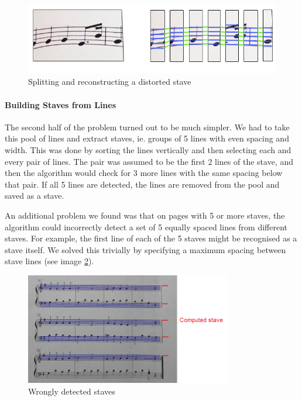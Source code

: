 \begin{figure}[h!]
    \centering
    \includegraphics[width=120mm]{./assets/building_lines.png}
    \caption{Splitting and reconstructing a distorted stave}
    \label{image:linesjoining}
\end{figure}

\paragraph{Building Staves from Lines}

The second half of the problem turned out to be much simpler. We had to take this pool of lines and extract staves, ie. groups of 5 lines with even spacing and width. This was done by sorting the lines vertically and then selecting each and every pair of lines. The pair was assumed to be the first 2 lines of the stave, and then the algorithm would check for 3 more lines with the same spacing below that pair. If all 5 lines are detected, the lines
are removed from the pool and saved as a stave.

An additional problem we found was that on pages with 5 or more staves, the algorithm could incorrectly detect a set of 5 equally spaced lines from different staves. For example, the first line of each of the 5 staves might be recognised as a stave itself. We solved this trivially by specifying a maximum spacing between stave lines (see image \ref{image:brokenstaves}).

\begin{figure}[h!]
    \centering
    \includegraphics[width=90mm]{./assets/brokenStaves.jpg}
    \caption{Wrongly detected staves}
    \label{image:brokenstaves}
\end{figure}

